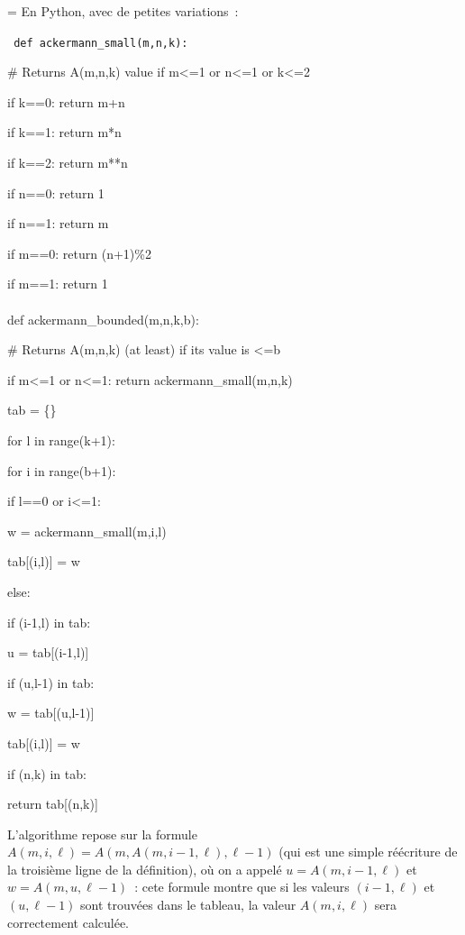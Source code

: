 \documentclass[12pt,a4paper]{article}
\theoremstyle{definition}
\newif\ifcorrige
\newenvironment{corrige}%
{\ifcorrige\relax\else\setbox0=\vbox\bgroup\fi%
\smallbreak\footnotesize\noindent{\underbar{\textit{Corrigé.}}\quad}}
{{\hbox{}\nobreak\hfill\checkmark}%
\ifcorrige\relax\else\egroup\fi\par}
\begin{document}
\begin{corrige}
En Python, avec de petites variations :

{\tt\noindent
def ackermann\_small(m,n,k):\\
\strut\quad \# Returns A(m,n,k) value if m<=1 or n<=1 or k<=2\\
\strut\quad if k==0: return m+n\\
\strut\quad if k==1: return m*n\\
\strut\quad if k==2: return m**n\\
\strut\quad if n==0: return 1\\
\strut\quad if n==1: return m\\
\strut\quad if m==0: return (n+1)\%2\\
\strut\quad if m==1: return 1\\
\\
def ackermann\_bounded(m,n,k,b):\\
\strut\quad \# Returns A(m,n,k) (at least) if its value is <=b\\
\strut\quad if m<=1 or n<=1: return ackermann\_small(m,n,k)\\
\strut\quad tab = \{\}\\
\strut\quad for l in range(k+1):\\
\strut\quad \strut\quad for i in range(b+1):\\
\strut\quad \strut\quad \strut\quad if l==0 or i<=1:\\
\strut\quad \strut\quad \strut\quad \strut\quad w = ackermann\_small(m,i,l)\\
\strut\quad \strut\quad \strut\quad \strut\quad tab[(i,l)] = w\\
\strut\quad \strut\quad \strut\quad else:\\
\strut\quad \strut\quad \strut\quad \strut\quad if (i-1,l) in tab:\\
\strut\quad \strut\quad \strut\quad \strut\quad \strut\quad u = tab[(i-1,l)]\\
\strut\quad \strut\quad \strut\quad \strut\quad \strut\quad if (u,l-1) in tab:\\
\strut\quad \strut\quad \strut\quad \strut\quad \strut\quad \strut\quad w = tab[(u,l-1)]\\
\strut\quad \strut\quad \strut\quad \strut\quad \strut\quad \strut\quad tab[(i,l)] = w\\
\strut\quad if (n,k) in tab:\\
\strut\quad \strut\quad return tab[(n,k)]
}

L'algorithme repose sur la formule $A(m,i,\ell) =
A(m,A(m,i-1,\ell),\ell-1)$ (qui est une simple réécriture de la
troisième ligne de la définition), où on a appelé $u = A(m,i-1,\ell)$
et $w = A(m,u,\ell-1)$ : cete formule montre que si les valeurs
$(i-1,\ell)$ et $(u,\ell-1)$ sont trouvées dans le tableau, la valeur
$A(m,i,\ell)$ sera correctement calculée.


\end{corrige}
\end{document}
